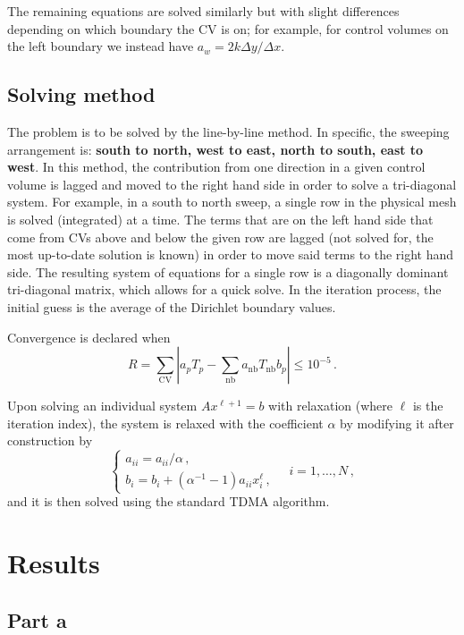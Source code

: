 \documentclass{article}
\begin{document}
The remaining equations are solved similarly but with slight differences depending on which boundary the CV is on; for example, for control volumes on the left boundary we instead have $a_w = 2 k \Delta y / \Delta x$.

\subsection*{Solving method}

The problem is to be solved by the line-by-line method. In specific, the sweeping arrangement is: \textbf{south to north, west to east, north to south, east to west}. In this method, the contribution from one direction in a given control volume is lagged and moved to the right hand side in order to solve a tri-diagonal system. For example, in a south to north sweep, a single row in the physical mesh is solved (integrated) at a time. The terms that are on the left hand side that come from CVs above and below the given row are lagged (not solved for, the most up-to-date solution is known) in order to move said terms to the right hand side. The resulting system of equations for a single row is a diagonally dominant tri-diagonal matrix, which allows for a quick solve. In the iteration process, the initial guess is the average of the Dirichlet boundary values.

Convergence is declared when
\begin{equation}
	R = \sum_\text{CV} \left| a_p T_p - \sum_{\text{nb}} a_\text{nb} T_\text{nb} b_p\right|\leq 10^{-5}\,.
\end{equation}

Upon solving an individual system $Ax^{\ell + 1} = b$ with relaxation (where $\ell$ is the iteration index), the system is relaxed with the coefficient $\alpha$ by modifying it after construction by
\[
	\begin{cases}
		a_{ii} = a_{ii} / \alpha\,,\\
		b_i = b_i + (\alpha^{-1} - 1) a_{ii} x_i^\ell\,,
	\end{cases} \quad i = 1, \ldots, N\,,
\]
and it is then solved using the standard TDMA algorithm.

\section*{Results}

\subsection*{Part a}
\end{document}
